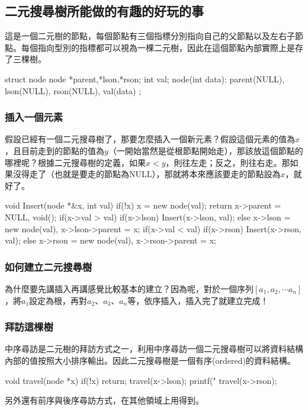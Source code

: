  \subsection{二元搜尋樹所能做的有趣的好玩的事}
這是一個二元樹的節點，每個節點有三個指標分別指向自己的父節點以及左右子節點。每個指向型別的指標都可以視為一棵二元樹，因此在這個節點內部實際上是存了三棵樹。
 \begin{C++}
struct node {
    node *parent,*lson,*rson;
    int val;
    node(int data):
    	parent(NULL), lson(NULL), rson(NULL), val(data){}
};
 \end{C++}
 \subsubsection{插入一個元素}
 假設已經有一個二元搜尋樹了，那要怎麼插入一個新元素？假設這個元素的值為$x$，且目前走到的節點的值為$y$（一開始當然是從根節點開始走），那該放這個節點的哪裡呢？根據二元搜尋樹的定義，如果$x < y$，則往左走；反之，則往右走。那如果沒得走了（也就是要走的節點為NULL），那就將本來應該要走的節點設為$x$，就好了。
 \begin{C++}
void Insert(node *&x, int val) {
    if(!x) {
        x = new node(val);
        return x->parent = NULL, void();
    }
    if(x->val > val){
        if(x->lson) Insert(x->lson, val);
        else x->lson =
            new node(val), x->lson->parent = x;
    }
    if(x->val < val){
        if(x->rson) Insert(x->rson, val);
        else x->rson =
            new node(val), x->rson->parent = x;
    }
}
 \end{C++}
 \subsubsection{如何建立二元搜尋樹}
 為什麼要先講插入再講感覺比較基本的建立？因為呢，對於一個序列$[a_1, a_2, \cdots a_n]$，將$a_1$設定為根，再對$a_2$、$a_3$、$a_n$等，依序插入，插入完了就建立完成！
 \subsubsection{拜訪這棵樹}
 中序尋訪是二元樹的拜訪方式之一，利用中序尋訪一個二元搜尋樹可以將資料結構內部的值按照大小排序輸出。因此二元搜尋樹是一個有序(ordered)的資料結構。
 \begin{C++}
void travel(node *x){
    if(!x) return;
    travel(x->lson);
    printf("%
    travel(x->rson);
}
 \end{C++}
\indent\indent 另外還有前序與後序尋訪方式，在其他領域上用得到。
